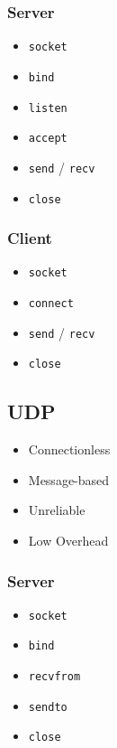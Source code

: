 \documentclass[10pt]{extarticle}
\begin{document}
\begin{multicols}{2}
\begin{multicols}{2}
    \subsubsection*{Server}
    \begin{itemize}
      \item \texttt{socket}
      \item \texttt{bind}
      \item \texttt{listen}
      \item \texttt{accept}
      \item \texttt{send} / \texttt{recv}
      \item \texttt{close}
    \end{itemize}

    \subsubsection*{Client}
    \begin{itemize}
      \item \texttt{socket}
      \item \texttt{connect}
      \item \texttt{send} / \texttt{recv}
      \item \texttt{close}
    \end{itemize}

    \columnbreak

    \subsection*{UDP}
    \begin{itemize}
      \item Connectionless
      \item Message-based
      \item Unreliable
      \item Low Overhead
    \end{itemize}

    \subsubsection*{Server}
    \begin{itemize}
      \item \texttt{socket}
      \item \texttt{bind}
      \item \texttt{recvfrom}
      \item \texttt{sendto}
      \item \texttt{close}
    \end{itemize}


\end{multicols}
\end{multicols}
\end{document}
